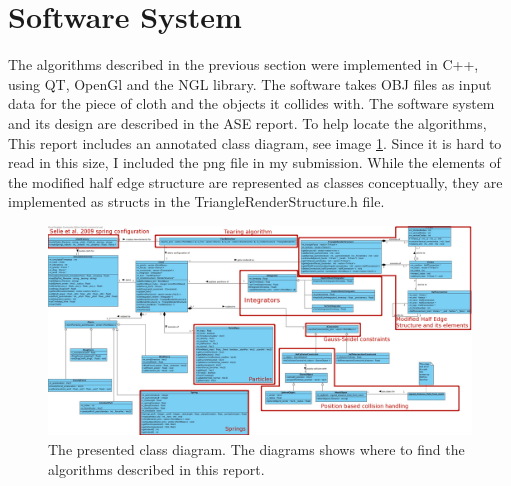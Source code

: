 
\ifx\isEmbedded\undefined

\graphicspath{{../img/}}

\fi

\section{Software System} \label{sec_software}
The algorithms described in the previous section were implemented in C++, using QT, OpenGl and the NGL library. The software takes OBJ files as input data for the piece of cloth and the objects it collides with. The software system and its design are described in the ASE report. To help locate the algorithms, This report includes an annotated class diagram, see image \ref{fig_class}. Since it is hard to read in this size, I included the png file in my submission. While the elements of the modified half edge structure are represented as classes conceptually, they are implemented as structs in the TriangleRenderStructure.h file.\\

\begin{figure}
   \centering
     \includegraphics[width=\textheight, angle = 90]{img/annotated_diagram.png}
  \caption{The presented class diagram. The diagrams shows where to find the algorithms described in this report.}
 \label{fig_class}
\end{figure}

\ifx\isEmbedded\undefined


\pagebreak

\fi